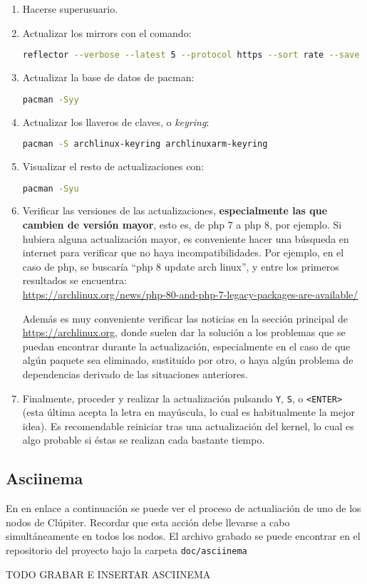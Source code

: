\begin{enumerate}
    \item Hacerse superusuario.
    \item Actualizar los mirrors con el comando:
\begin{lstlisting}[language=bash]
reflector --verbose --latest 5 --protocol https --sort rate --save /etc/pacman.d/mirrorlist
\end{lstlisting}
    \item Actualizar la base de datos de pacman:
\begin{lstlisting}[language=bash]
pacman -Syy
\end{lstlisting}
    \item Actualizar los llaveros de claves, o \textit{keyring}:
\begin{lstlisting}[language=bash]
pacman -S archlinux-keyring archlinuxarm-keyring
\end{lstlisting}
    \item Visualizar el resto de actualizaciones con:
\begin{lstlisting}[language=bash]
pacman -Syu
\end{lstlisting}
    \item Verificar las versiones de las actualizaciones, \textbf{especialmente las que cambien de versión mayor}, esto es, de php 7 a php 8, por ejemplo. Si hubiera alguna actualización mayor, es conveniente hacer una búsqueda en internet para verificar que no haya incompatibilidades.
    Por ejemplo, en el caso de php, se buscaría ``php 8 update arch linux'', y entre los primeros resultados se encuentra: \\\footnotesize\url{https://archlinux.org/news/php-80-and-php-7-legacy-packages-are-available/}\normalsize

    Además es muy conveniente verificar las noticias en la sección principal de \url{https://archlinux.org}, donde suelen dar la solución a los problemas que se puedan encontrar durante la actualización, especialmente en el caso de que algún paquete sea eliminado, sustituído por otro, o haya algún problema de dependencias derivado de las situaciones anteriores.

    \item Finalmente, proceder y realizar la actualización pulsando \texttt{Y}, \texttt{S}, o \texttt{<ENTER>} (esta última acepta la letra en mayúscula, lo cual es habitualmente la mejor idea). Es recomendable reiniciar tras una actualización del kernel, lo cual es algo probable si éstas se realizan cada bastante tiempo.
\end{enumerate}

\subsection{Asciinema}
En en enlace a continuación se puede ver el proceso de actualiación de uno de los nodos de Clúpiter. Recordar que esta acción debe llevarse a cabo simultáneamente en todos los nodos. El archivo grabado se puede encontrar en el repositorio del proyecto bajo la carpeta \texttt{doc/asciinema}

TODO GRABAR E INSERTAR ASCIINEMA
